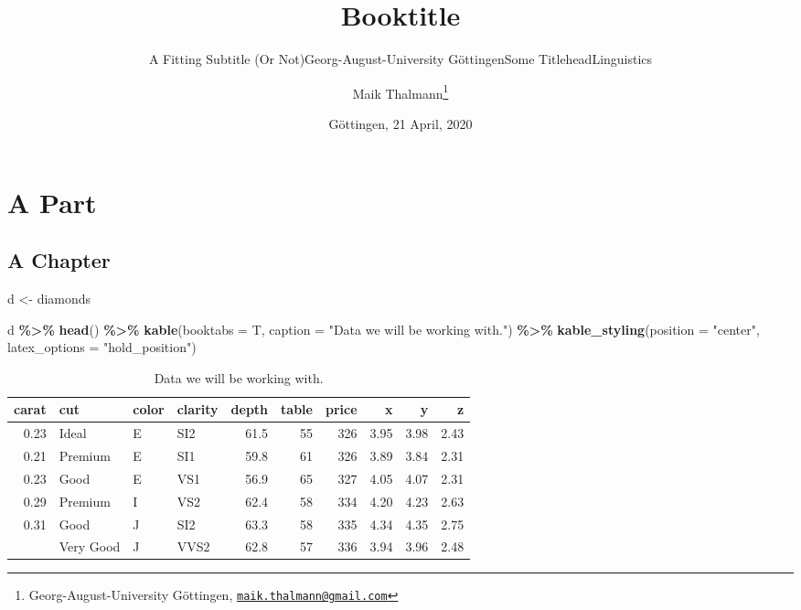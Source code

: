 \documentclass[
    numbers=noenddot,
    open=any,
    paper=a4,
    oneside,
    pagesize,
    captions=tableabove,
    bibliography=totoc,
    11pt
    ]{scrbook}
\title{Booktitle}
\subtitle{A Fitting Subtitle (Or Not)}
\subtitle{Georg-August-University Göttingen}
\subtitle{Some Titlehead}
\subtitle{Linguistics}
\author{Maik Thalmann\footnote{Georg-August-University Göttingen,
  \href{mailto:maik.thalmann@gmail.com}{\nolinkurl{maik.thalmann@gmail.com}}}}
\date{Göttingen, 21 April, 2020}
\newenvironment{Shaded}{\begin{snugshade}}{\end{snugshade}}
\newcommand{\DataTypeTok}[1]{\textcolor[rgb]{0.13,0.29,0.53}{#1}}
\newcommand{\KeywordTok}[1]{\textcolor[rgb]{0.13,0.29,0.53}{\textbf{#1}}}
\newcommand{\NormalTok}[1]{#1}
\newcommand{\OperatorTok}[1]{\textcolor[rgb]{0.81,0.36,0.00}{\textbf{#1}}}
\newcommand{\StringTok}[1]{\textcolor[rgb]{0.31,0.60,0.02}{#1}}
\begin{document}
\maketitle

\tableofcontents
\hypertarget{a-part}{%
\part{A Part}\label{a-part}}

\hypertarget{a-chapter}{%
\chapter{A Chapter}\label{a-chapter}}

\begin{Shaded}
\begin{Highlighting}[]
\NormalTok{d \textless{}{-}}\StringTok{ }\NormalTok{diamonds}

\NormalTok{d }\OperatorTok{\%\textgreater{}\%}
\StringTok{  }\KeywordTok{head}\NormalTok{() }\OperatorTok{\%\textgreater{}\%}
\StringTok{  }\KeywordTok{kable}\NormalTok{(}\DataTypeTok{booktabs =}\NormalTok{ T, }\DataTypeTok{caption =} \StringTok{"Data we will be working with."}\NormalTok{) }\OperatorTok{\%\textgreater{}\%}
\StringTok{  }\KeywordTok{kable\_styling}\NormalTok{(}\DataTypeTok{position =} \StringTok{"center"}\NormalTok{, }\DataTypeTok{latex\_options =} \StringTok{"hold\_position"}\NormalTok{)}
\end{Highlighting}
\end{Shaded}

\begin{table}[!h]

\caption{\label{tab:data}Data we will be working with.}
\centering
\begin{tabular}[t]{rlllrrrrrr}
\toprule
carat & cut & color & clarity & depth & table & price & x & y & z\\
\midrule
0.23 & Ideal & E & SI2 & 61.5 & 55 & 326 & 3.95 & 3.98 & 2.43\\
0.21 & Premium & E & SI1 & 59.8 & 61 & 326 & 3.89 & 3.84 & 2.31\\
0.23 & Good & E & VS1 & 56.9 & 65 & 327 & 4.05 & 4.07 & 2.31\\
0.29 & Premium & I & VS2 & 62.4 & 58 & 334 & 4.20 & 4.23 & 2.63\\
0.31 & Good & J & SI2 & 63.3 & 58 & 335 & 4.34 & 4.35 & 2.75\\
\addlinespace
0.24 & Very Good & J & VVS2 & 62.8 & 57 & 336 & 3.94 & 3.96 & 2.48\\
\bottomrule
\end{tabular}
\end{table}
\end{document}
